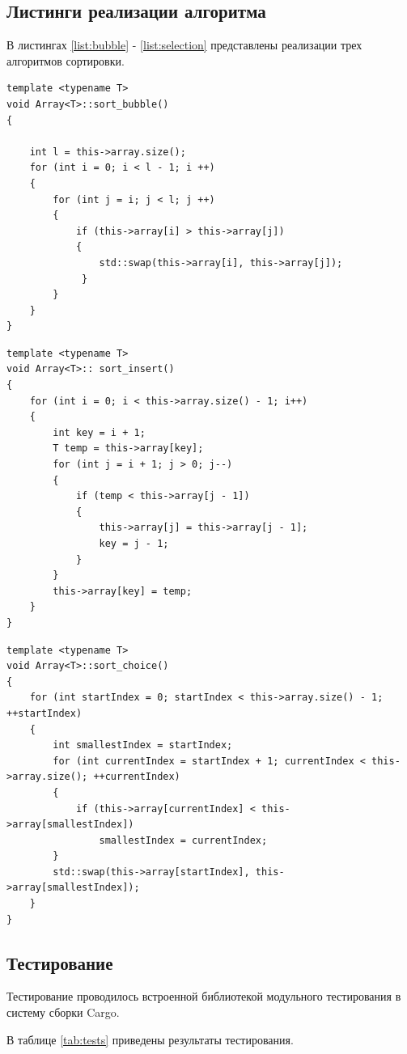 \documentclass[14pt,russian]{scrartcl}
\begin{document}
\subsection{Листинги реализации алгоритма}

В листингах \ref{list:bubble} - \ref{list:selection} представлены реализации трех алгоритмов сортировки.

\begin{lstlisting}[label=list:bubble, caption=Функция сортировки массива методом пузырька]
template <typename T>
void Array<T>::sort_bubble()
{
	
	int l = this->array.size();
	for (int i = 0; i < l - 1; i ++)
	{
		for (int j = i; j < l; j ++)
		{
			if (this->array[i] > this->array[j])
			{
				std::swap(this->array[i], this->array[j]);
			 }
		}
	}
}
\end{lstlisting}

\begin{lstlisting}[label=list:insertion, caption=Функция сортировки массива методом вставок]
template <typename T>
void Array<T>:: sort_insert()
{
	for (int i = 0; i < this->array.size() - 1; i++)
	{
		int key = i + 1;
		T temp = this->array[key];
		for (int j = i + 1; j > 0; j--)
		{
			if (temp < this->array[j - 1])
			{
				this->array[j] = this->array[j - 1];
				key = j - 1;
			}
		}
		this->array[key] = temp;
	}
}
\end{lstlisting}

\begin{lstlisting}[label=list:selection, caption=Функция сортировки массива методом выбора]
template <typename T>
void Array<T>::sort_choice()
{
	for (int startIndex = 0; startIndex < this->array.size() - 1; ++startIndex)
	{
		int smallestIndex = startIndex;
		for (int currentIndex = startIndex + 1; currentIndex < this->array.size(); ++currentIndex)
		{
			if (this->array[currentIndex] < this->array[smallestIndex])
				smallestIndex = currentIndex;
		}
		std::swap(this->array[startIndex], this->array[smallestIndex]);
	}
}
\end{lstlisting}

\clearpage

\subsection{Тестирование}

Тестирование проводилось встроенной библиотекой модульного тестирования в систему сборки Cargo.

В таблице \ref{tab:tests} приведены результаты тестирования.
\end{document}
